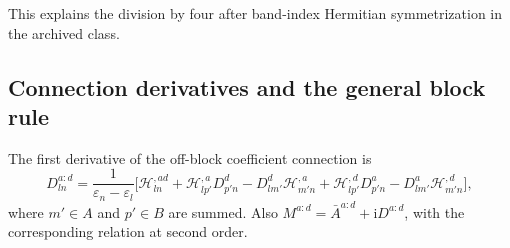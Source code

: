 \documentclass[prx,amsmath,amssymb,superscriptaddress,longbibliography]{revtex4-2}
\newcommand{\ii}{\mathrm{i}}
\newcommand{\code}[1]{\texttt{\detokenize{#1}}}
\begin{document}
This explains the division by four after band-index Hermitian symmetrization
in the archived \code{BCP} class.

\subsection{Connection derivatives and the general block rule}
The first derivative of the off-block coefficient connection is
\begin{equation}
    D_{ln}^{a:d}=\frac{1}{\varepsilon_n-\varepsilon_l}
 \big[\mathcal H_{ln}^{,ad} +\mathcal H_{lp'}^{,a}D_{p'n}^d-D_{lm'}^d\mathcal H_{m'n}^{,a} + \mathcal H_{lp'}^{,d}D_{p'n}^a-D_{lm'}^a\mathcal H_{m'n}^{,d}\big], \label{eq:Dfirst}
\end{equation}
where $m' \in A$ and $p' \in B$ are summed.
Also $M^{a:d}=\bar A^{a:d}+\ii D^{a:d}$, with the corresponding relation at second order.
\end{document}
